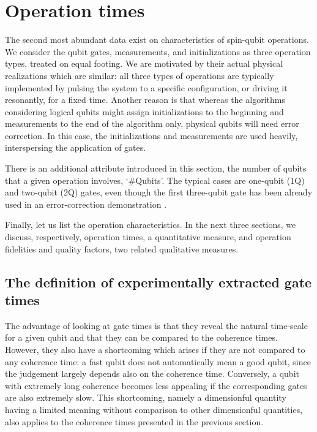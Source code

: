 \documentclass[aps, prx, showpacs, twocolumn, superscriptaddress, notitlepage, longbibliography, floatfix, nofootinbib]{revtex4-2}
\newcommand{\myKey}[1]{$\whitearrowupfrombar$\textit{#1}}
\renewcommand{\myKey}[1]{\textit{#1}}
\renewcommand{\myKey}[1]{`{#1}'}
\newcommand{\recheck}[1]{{#1}}
\begin{document}
\vspace{-0.3cm}
\section{Operation times}

\label{sec:operations}

The second most abundant data exist on characteristics of spin-qubit operations. We consider the qubit gates, measurements, and initializations as three operation types, treated on equal footing.
We are motivated by their actual physical realizations which are similar: all three types of operations are typically implemented by pulsing the system to a specific configuration, or driving it resonantly, for a fixed time. Another reason is that whereas the algorithms considering logical qubits might assign initializations to the beginning and measurements to the end of the algorithm only, physical qubits will need error correction. In this case, the initializations and measurements are used heavily, interspersing the application of gates.


There is an additional attribute introduced in this section, the number of qubits that a given operation involves, \myKey{\#Qubits}. \recheck{The typical cases are one-qubit (1Q) and two-qubit (2Q) gates, even though the first three-qubit gate has been already used in an error-correction demonstration \cite{takeda_quantum_2022}. 
}

Finally, let us list the operation characteristics. In the next three sections, we discuss, respectively, operation times, a quantitative measure, and operation fidelities and quality factors, two related qualitative measures. 


\subsection{The definition of experimentally extracted gate times}

The advantage of looking at gate times is that they reveal the natural time-scale for a given qubit and that they can be compared to the coherence times. However, they also have a shortcoming which arises if they are not compared to any coherence time: a fast qubit does not automatically mean a good qubit, since the judgement largely depends also on the coherence time. Conversely, a qubit with extremely long coherence becomes less appealing if the corresponding gates are also extremely slow. This shortcoming, namely a dimensionful quantity having a limited meaning without comparison to other dimensionful quantities, also applies to the coherence times presented in the previous section. 
\end{document}
